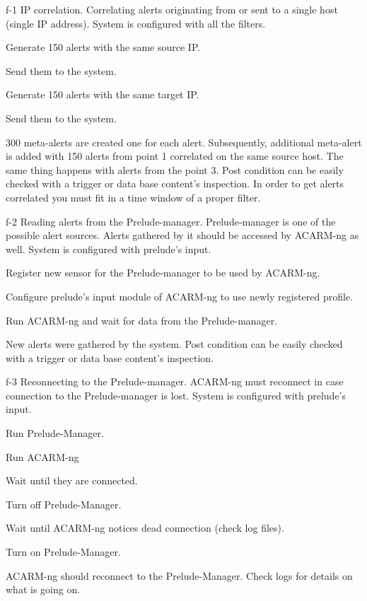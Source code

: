 \testCase
{f-1}
{IP correlation.}
{Correlating alerts originating from or sent to a single host (single IP address).}
{System is configured with all the filters.}
{
\begin{enumerate*}
\item Generate 150 alerts with the same source IP.
\item Send them to the system.
\item Generate 150 alerts with the same target IP.
\item Send them to the system.
\end{enumerate*}
}
{300 meta-alerts are created one for each alert. Subsequently, additional meta-alert is added with 150 alerts from point 1 correlated on the same source host. The same thing happens with alerts from the point 3.}
{Post condition can be easily checked with a trigger or data base content's inspection. In order to get alerts correlated you must fit in a time window of a proper filter.}


\testCase
{f-2}
{Reading alerts from the Prelude-manager.}
{Prelude-manager is one of the possible alert sources. Alerts gathered by it should be accessed by ACARM-ng as well.}
{System is configured with prelude's input.}
{
\begin{enumerate*}
\item Register new sensor for the Prelude-manager to be used by ACARM-ng.
\item Configure prelude's input module of ACARM-ng to use newly registered profile.
\item Run ACARM-ng and wait for data from the Prelude-manager.
\end{enumerate*}
}
{New alerts were gathered by the system.}
{Post condition can be easily checked with a trigger or data base content's inspection.}


\testCase
{f-3}
{Reconnecting to the Prelude-manager.}
{ACARM-ng must reconnect in case connection to the Prelude-manager is lost.}
{System is configured with prelude's input.}
{
\begin{enumerate*}
\item Run Prelude-Manager.
\item Run ACARM-ng
\item Wait until they are connected.
\item Turn off Prelude-Manager.
\item Wait until ACARM-ng notices dead connection (check log files).
\item Turn on Prelude-Manager.
\end{enumerate*}
}
{ACARM-ng should reconnect to the Prelude-Manager.}
{Check logs for details on what is going on.}


